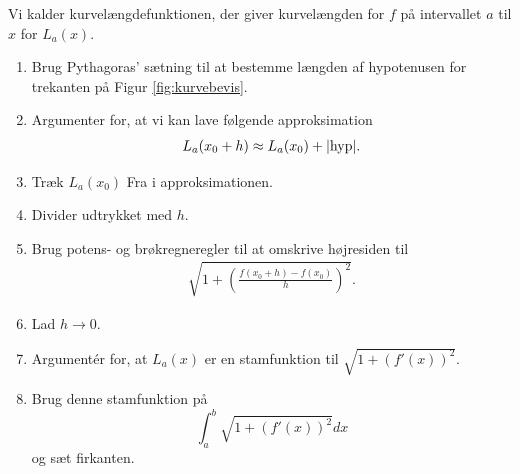 Vi kalder kurvelængdefunktionen, der giver kurvelængden for $f$ på intervallet $a$ til $x$ for $L_a(x)$. 
\begin{enumerate}[label=\roman*)]
	\item Brug Pythagoras' sætning til at bestemme længden af hypotenusen for trekanten på Figur \ref{fig:kurvebevis}.
	\item Argumenter for, at vi kan lave følgende approksimation
	\begin{align*}
		L_a(x_0 + h) \approx L_a(x_0) + |\textnormal{hyp}|.
	\end{align*}
	\item Træk $L_a(x_0)$ Fra i approksimationen. 
	\item Divider udtrykket med $h$. 
	\item Brug potens- og brøkregneregler til at omskrive højresiden til
	\begin{align*}
		\sqrt{1 + \left(\frac{f(x_0 + h)-f(x_0)}{h}\right)^2}.
	\end{align*}
	\item Lad $h \to 0$. 
	\item Argumentér for, at $L_a(x)$ er en stamfunktion til $\sqrt{1 + (f'(x))^2}$.
	\item Brug denne stamfunktion på 
	$$\int_a^b \sqrt{1 + (f'(x))^2} dx$$
	 og sæt firkanten. 
\end{enumerate}
